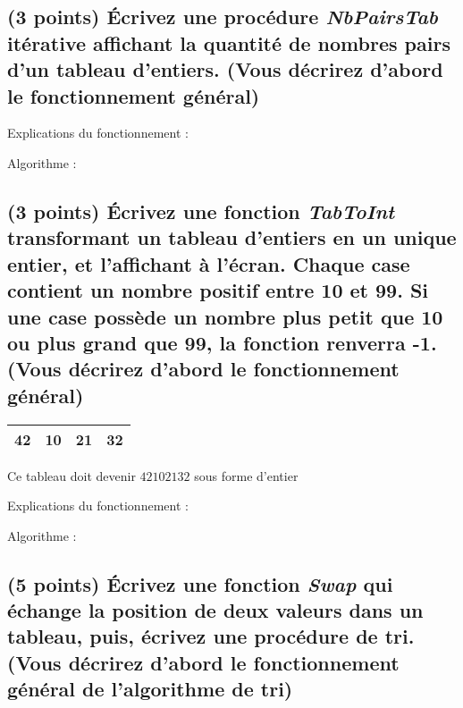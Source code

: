 \documentclass[11pt,a4paper]{article}
\begin{document}
\clearpage


\subsection{(3 points) \'Ecrivez une procédure \og \textit{NbPairsTab} \fg{} itérative affichant la quantité de nombres pairs d'un tableau d'entiers. (Vous décrirez d'abord le fonctionnement général) }


\begin{center}
Explications du fonctionnement :

Algorithme :
\end{center}




\subsection{(3 points) \'Ecrivez une fonction \og \textit{TabToInt} \fg{} transformant un tableau d'entiers en un unique entier, et l'affichant à l'écran. Chaque case contient un nombre positif entre 10 et 99. Si une case possède un nombre plus petit que 10 ou plus grand que 99, la fonction renverra -1. (Vous décrirez d'abord le fonctionnement général) }


\begin{center}
  \begin{tabular}{| c | c | c | c |}
    \hline
    42 & 10 & 21 & 32 \\
    \hline
  \end{tabular}

  \smallskip

  Ce tableau doit devenir $ 42102132 $ sous forme d'entier
\end{center}


\begin{center}
Explications du fonctionnement :

Algorithme :
\end{center}


\subsection{(5 points) \'Ecrivez une fonction \og \textit{Swap} \fg{} qui échange la position de deux valeurs dans un tableau, puis, écrivez une procédure de tri. (Vous décrirez d'abord le fonctionnement général de l'algorithme de tri) }
\end{document}
